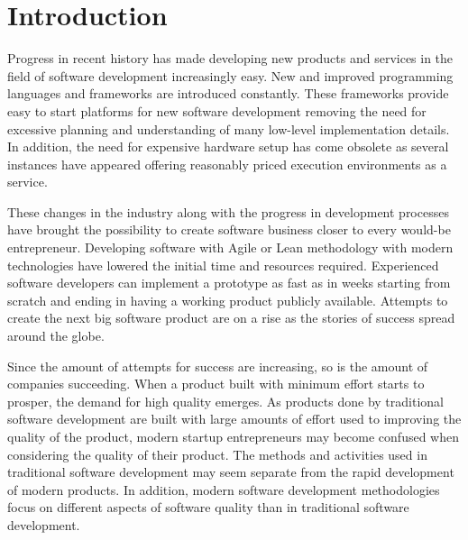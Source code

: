 
\chapter{Introduction}

% 

Progress in recent history has made developing new products and services in the field of software development increasingly easy. New and improved programming languages and frameworks are introduced constantly. These frameworks provide easy to start platforms for new software development removing the need for excessive planning and understanding of many low-level implementation details. In addition, the need for expensive hardware setup has come obsolete as several instances have appeared offering reasonably priced execution environments as a service. 

These changes in the industry along with the progress in development processes have brought the possibility to create software business closer to every would-be entrepreneur. Developing software with Agile or Lean methodology with modern technologies have lowered the initial time and resources required. Experienced software developers can implement a prototype as fast as in weeks starting from scratch and ending in having a working product publicly available. Attempts to create the next big software product are on a rise as the stories of success spread around the globe.


% 

Since the amount of attempts for success are increasing, so is the amount of companies succeeding. When a product built with minimum effort starts to prosper, the demand for high quality emerges. As products done by traditional software development are built with large amounts of effort used to improving the quality of the product, modern startup entrepreneurs may become confused when considering the quality of their product. The methods and activities used in traditional software development may seem separate from the rapid development of modern products. In addition, modern software development methodologies focus on different aspects of software quality than in traditional software development.

